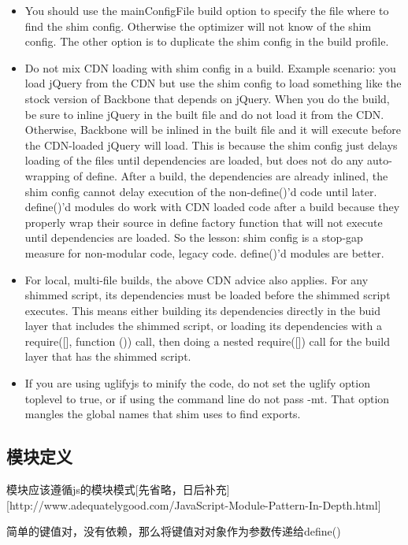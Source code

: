 \begin{itemize}
\item You should use the mainConfigFile build option to specify the file where to find the shim config. Otherwise the optimizer will not know of the shim config. The other option is to duplicate the shim config in the build profile.
\item Do not mix CDN loading with shim config in a build. Example scenario: you load jQuery from the CDN but use the shim config to load something like the stock version of Backbone that depends on jQuery. When you do the build, be sure to inline jQuery in the built file and do not load it from the CDN. Otherwise, Backbone will be inlined in the built file and it will execute before the CDN-loaded jQuery will load. This is because the shim config just delays loading of the files until dependencies are loaded, but does not do any auto-wrapping of define. After a build, the dependencies are already inlined, the shim config cannot delay execution of the non-define()'d code until later. define()'d modules do work with CDN loaded code after a build because they properly wrap their source in define factory function that will not execute until dependencies are loaded. So the lesson: shim config is a stop-gap measure for non-modular code, legacy code. define()'d modules are better.
\item For local, multi-file builds, the above CDN advice also applies. For any shimmed script, its dependencies must be loaded before the shimmed script executes. This means either building its dependencies directly in the buid layer that includes the shimmed script, or loading its dependencies with a require([], function (){}) call, then doing a nested require([]) call for the build layer that has the shimmed script.
\item If you are using uglifyjs to minify the code, do not set the uglify option toplevel to true, or if using the command line do not pass -mt. That option mangles the global names that shim uses to find exports.
\end{itemize}





\subsection{模块定义}
模块应该遵循js的模块模式[先省略，日后补充][http://www.adequatelygood.com/JavaScript-Module-Pattern-In-Depth.html]

简单的键值对，没有依赖，那么将键值对对象作为参数传递给define()

